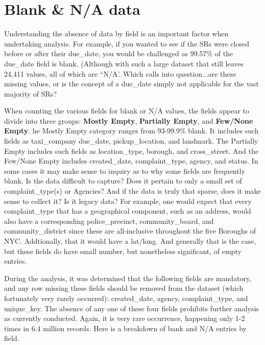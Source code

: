 \documentclass[12pt, titlepage]{article}
\begin{document}
 

\section{Blank \& N/A data}\label{sec:blanks}

Understanding the absence of data by field is an important factor 
when undertaking analysis. For example, if you wanted to see if the SRs were
closed before or after their due\_date, you would be challenged 
as 99.57\% of the due\_date field is blank. (Although with such a large dataset
that still leaves 24,411 values, all of which are ``N/A'. Which calls 
into question...are these missing values, or is the concept of a
due\_date simply not applicable for the vast majority of SRs?

When counting the various fields for blank or N/A values, the fields appear 
to divide into three groups: \textbf{Mostly Empty}, \textbf{Partially Empty}, 
and \textbf{Few/None Empty}. he Mostly Empty category ranges from 93-99.9\% blank. 
It includes such fields as taxi\_company due\_date, pickup\_location, and 
landmark. The Partially Empty includes such fields as location\_type, borough, 
and cross\_street. And the Few/None Empty includes created\_date, 
complaint\_type, agency, and status. In some cases it may make 
sense to inquiry as to why some fields are frequently blank. Is the data 
difficult to capture? Does it pertain to only a small set of 
complaint\_type(s) or Agencies? And if the data is truly that sparse, 
does it make sense to collect it? Is it legacy data? For example, 
one would expect that every complaint\_type that has a geographical 
component, such as an address, would also have a corresponding 
police\_precinct, community\_board, and community\_district since these
are all-inclusive throughout the five Boroughs of NYC. Addtionally, 
that it would have a lat/long. And generally that is the case, but these fields 
do have small number, but nonetheless significant, of empty entries. 

During the analysis, it was determined that the following fields are mandatory, 
and any row missing these fields should be removed from the dataset (which fortunately
very rarely occurred): created\_date, agency, complaint\_type, and unique\_key. 
The absence of any one of these four fields prohibits further analysis  as currently 
conducted. Again, it is very rare occurrence, happening only 1-2 times 
in 6.4 million records. Here is a breakdown of bank and N/A entries by field.
\end{document}

